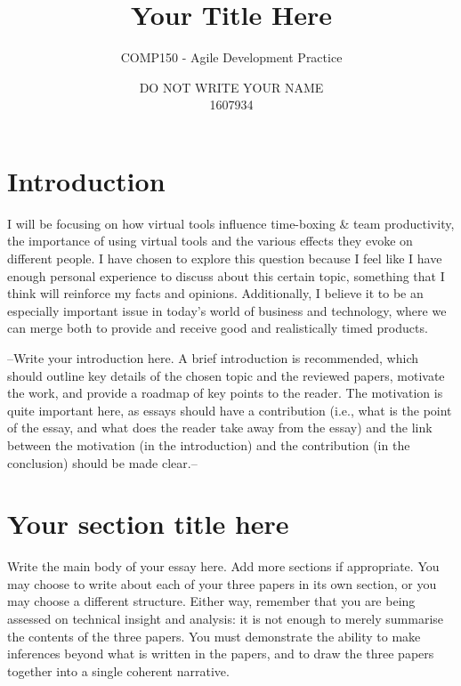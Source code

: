 \documentclass{scrartcl}
\title{Your Title Here}
\subtitle{COMP150 - Agile Development Practice}
\author{DO NOT WRITE YOUR NAME\\1607934}
\begin{document}
\maketitle


\section{Introduction}

I will be focusing on how virtual tools influence time-boxing & team productivity, the importance of using virtual tools and the various effects they evoke on different people. I have chosen to explore this question because I feel like I have enough personal experience to discuss about this certain topic, something that I think will reinforce my facts and opinions. Additionally, I believe it to be an especially important issue in today's world of business and technology, where we can merge both to provide and receive good and realistically timed products.

--Write your introduction here. A brief introduction is recommended, which should outline key details of the chosen topic and the reviewed papers, motivate the work, and provide a roadmap of key points to the reader. The motivation is quite important here, as essays should have a contribution (i.e., what is the point of the essay, and what does the reader take away from the essay) and the link between the motivation (in the introduction) and the contribution (in the conclusion) should be made clear.--

\section{Your section title here}

Write the main body of your essay here. Add more sections if appropriate. You may choose to write about each of your three papers in its own section, or you may choose a different structure. Either way, remember that you are being assessed on technical insight and analysis: it is not enough to merely summarise the contents of the three papers. You must demonstrate the ability to make inferences beyond what is written in the papers, and to draw the three papers together into a single coherent narrative.
\end{document}

